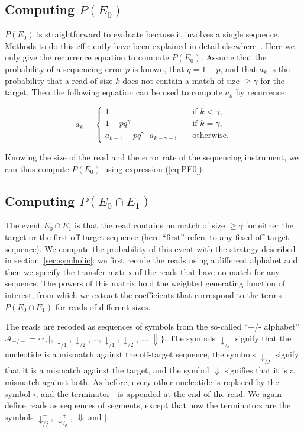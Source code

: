 \documentclass{article}
\begin{document}
\subsection{Computing $P(E_0)$}
\label{sec:cPE0}

$P(E_0)$ is straightforward to evaluate because it involves a single
sequence. Methods to do this efficiently have been explained in detail
elsewhere~\cite{filion2018analytic}. Here we only give the recurrence
equation to compute $P(E_0)$. Assume that the probability of a sequencing
error $p$ is known, that $q = 1-p$, and that $a_k$ is the probability that
a read of size $k$ does not contain a match of size $\geq \gamma$ for the
target. Then the following equation can be used to compute $a_k$ by
recurrence:

\begin{equation}
\label{eq:PE0}
a_k = 
\begin{cases}
1            &\quad\text{if } k < \gamma, \\
1 -pq^\gamma &\quad\text{if } k = \gamma, \\
a_{k-1} -pq^\gamma \cdot a_{k-\gamma-1} &\quad\text{otherwise.}
\end{cases}
\end{equation}

Knowing the size of the read and the error rate of the sequencing
instrument, we can thus compute $P(E_0)$ using expression (\ref{eq:PE0}).

\subsection{Computing $P(E_0 \cap E_1)$}
\label{sec:cPE0E1}

The event $E_0 \cap E_1$ is that the read contains no match of size $\geq
\gamma$ for either the target or the first off-target sequence (here
``first'' refers to any fixed off-target sequence). We compute the
probability of this event with the strategy described in
section~\ref{sec:symbolic}: we first recode the reads using a different
alphabet and then we specify the transfer matrix of the reads that have no
match for any sequence. The powers of this matrix hold the weighted
generating function of interest, from which we extract the coefficients
that correspond to the terms $P(E_0 \cap E_1)$ for reads of different
sizes.

The reads are recoded as sequences of symbols from the so-called ``+/-
alphabet'' $\mathcal{A}_{+/-} = \{\square, |, \downarrow_{/1}^-,
\downarrow_{/2}^-, \ldots, \downarrow_{/1}^+, \downarrow_{/2}^+, \ldots,
\Downarrow\}$. The symbols $\downarrow_{/j}^-$ signify that the nucleotide
is a mismatch against the off-target sequence, the symbols
$\downarrow_{/j}^+$ signify that it is a mismatch against the target, and
the symbol $\Downarrow$ signifies that it is a mismatch against both. As
before, every other nucleotide is replaced by the symbol $\square$, and
the terminator $|$ is appended at the end of the read. We again define
reads as sequences of segments, except that now the terminators are the
symbols $\downarrow_{/j}^-$, $\downarrow_{/j}^+$, $\Downarrow$ and $|$.
\end{document}
